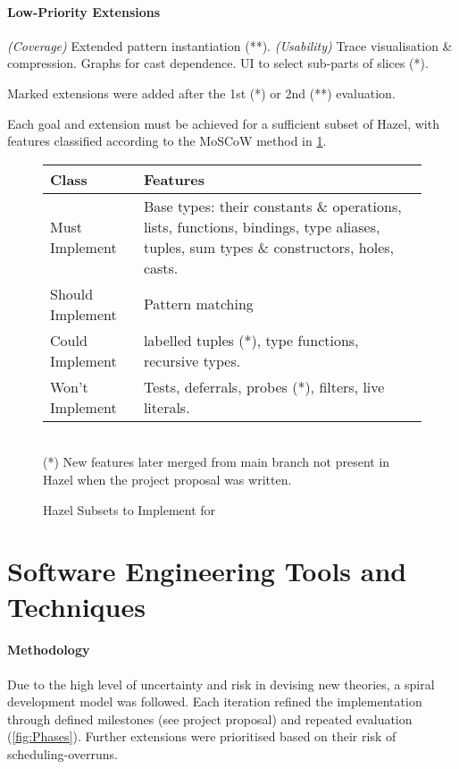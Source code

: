 \paragraph{{\color{blue} Low-Priority Extensions}} \textit{(Coverage)} Extended pattern instantiation (**). \textit{(Usability)} Trace visualisation \& compression. Graphs for cast dependence. UI to select sub-parts of slices (*). 


Marked extensions were added after the 1st (*) or 2nd (**) evaluation.

Each goal and extension must be achieved for a sufficient subset of Hazel, with features classified according to the MoSCoW method \cite{Moscow} in \cref{fig:Classes}.

\begin{figure}[h]
\begin{tabular}{lp{12cm}}
Class & Features\\
\hline
{\color{red}Must Implement} & {Base types: their constants \& operations, lists, functions, bindings, type aliases, tuples, sum types \& constructors, holes, casts.}\\
{\color{orange}Should Implement} & Pattern matching\\
{\color{blue}Could Implement} & labelled tuples (*), type functions, recursive types.\\
{\color{Green}Won't Implement} & Tests, deferrals, probes (*), filters, live literals.\\
\end{tabular}
\ \\

(*) New features later merged from main branch not present in Hazel when the project proposal was written. 
\caption{Hazel Subsets to Implement for}
\label{fig:Classes}
\end{figure}

\section{Software Engineering Tools and Techniques}\label{sec:EngineeringMethodology}
\paragraph{Methodology} Due to the high level of uncertainty and risk in devising new theories, a spiral development model was followed. Each iteration refined the implementation through defined milestones (see project proposal) and repeated evaluation (\cref{fig:Phases}). Further extensions were prioritised based on their risk of scheduling-overruns.

